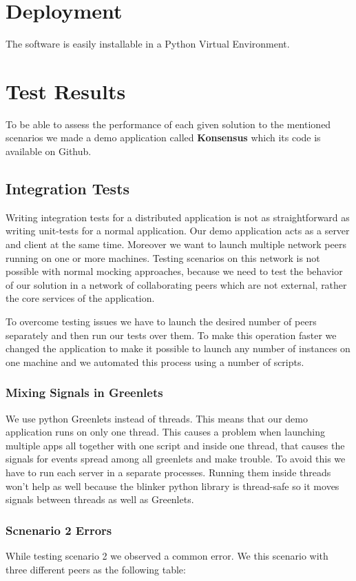 \section{Deployment}
The software is easily installable in a Python Virtual Environment.

\section{Test Results}
To be able to assess the performance of each given solution to the mentioned scenarios we made a demo application
called \textbf{Konsensus} which its code is available on Github. \cite{konsensus}

\subsection{Integration Tests}
Writing integration tests for a distributed application is not as straightforward as writing unit-tests for a normal application. 
Our demo application acts as a server and client at the same time. Moreover we want to launch multiple 
network peers running on one or more machines. Testing scenarios on this network is not possible with
normal mocking approaches, because we need to test the behavior of our solution in a network of collaborating
peers which are not external, rather the core services of the application.

To overcome testing issues we have to launch the desired number of peers separately and then run our tests 
over them. To make this operation faster we changed the application to make it possible to launch any number
of instances on one machine and we automated this process using a number of scripts. %

\subsubsection{Mixing Signals in Greenlets}
We use python Greenlets instead of threads. This means that our demo application runs on only one thread. 
This causes a problem when launching multiple apps all together with one script and inside one thread, that
causes the signals for events spread among all greenlets and make trouble. To avoid this we have to run
each server in a separate processes. Running them inside threads won't help as well because the blinker python
library is thread-safe so it moves signals between threads as well as Greenlets.

\subsubsection{Scnenario 2 Errors}
While testing scenario 2 we observed a common error. We this scenario with three different peers as the following table:

